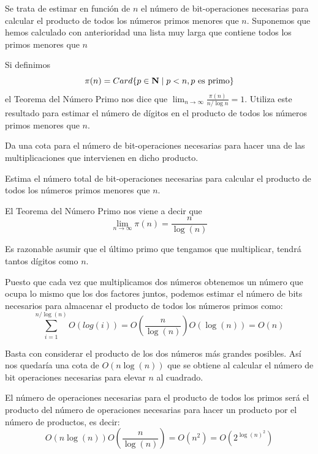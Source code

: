 \begin{problem}[10]
Se trata de estimar en función de $n$ el número de bit-operaciones
necesarias para calcular el producto de todos los números primos menores que
$n$. Suponemos que hemos calculado con anterioridad una lista muy larga que
contiene todos los primos menores que $n$

\ppart Si definimos 
\[\pi(n)=Card\{p\in\bold N\mid p<n, p \text{ es primo}\}\]
el Teorema del Número Primo nos dice que \linebreak $\lim_{n \to \infty}\frac{\pi(n)}{n/\log
n}=1$. Utiliza este resultado para estimar el número de dígitos en el producto
de todos los números primos menores que $n$.

\ppart Da una cota para el número de bit-operaciones necesarias para hacer una de
las multiplicaciones que intervienen en dicho producto.

\ppart Estima  el número total de bit-operaciones
necesarias para calcular el producto de todos los números primos menores que
$n$.
\solution


\spart

El Teorema del Número Primo nos viene a decir que 
\[\lim_{n\to \infty} π(n) = \frac{n}{\log(n)}\]

Es razonable asumir que el último primo que tengamos que multiplicar, tendrá tantos dígitos como $n$.

Puesto que cada vez que multiplicamos dos números obtenemos un número que ocupa lo mismo que los dos factores juntos, podemos estimar el número de bits necesarios para almacenar el producto de todos los números primos como:
\[\sum_{i=1}^{n/\log(n)}O(log(i)) = O\left( \frac{n}{\log(n)}\right) O(\log(n)) = O(n)\]

\spart

Basta con considerar el producto de los dos números más grandes posibles. Así nos quedaría una cota de $O(n\log(n))$ que se obtiene al calcular el número de bit operaciones necesarias para elevar $n$ al cuadrado.

\spart
El número de operaciones necesarias para el producto de todos los primos será el producto del número de operaciones necesarias para hacer un producto por el número de productos, es decir:
\[O(n \log(n))O\left(\frac{n}{\log(n)} \right) = O(n^2) = O\left(2^{\log(n)^2}\right)\]

\end{problem}
